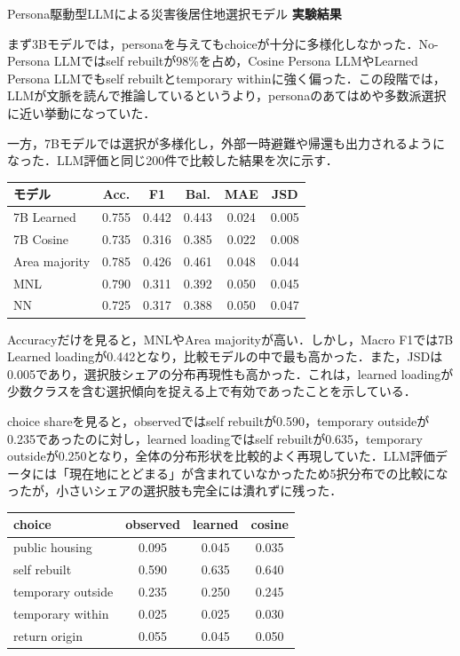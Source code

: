 \begin{column}{Persona駆動型LLMによる災害後居住地選択モデル}
\medskip
\noindent
\textbf{実験結果}

まず3Bモデルでは，personaを与えてもchoiceが十分に多様化しなかった．No-Persona LLMではself rebuiltが98\%を占め，Cosine Persona LLMやLearned Persona LLMでもself rebuiltとtemporary withinに強く偏った．この段階では，LLMが文脈を読んで推論しているというより，personaのあてはめや多数派選択に近い挙動になっていた．

一方，7Bモデルでは選択が多様化し，外部一時避難や帰還も出力されるようになった．LLM評価と同じ200件で比較した結果を次に示す．

\begin{center}
\scriptsize
\begin{tabular}{lccccc}
\toprule
モデル & Acc. & F1 & Bal. & MAE & JSD \\
\midrule
7B Learned & 0.755 & 0.442 & 0.443 & 0.024 & 0.005 \\
7B Cosine & 0.735 & 0.316 & 0.385 & 0.022 & 0.008 \\
Area majority & 0.785 & 0.426 & 0.461 & 0.048 & 0.044 \\
MNL & 0.790 & 0.311 & 0.392 & 0.050 & 0.045 \\
NN & 0.725 & 0.317 & 0.388 & 0.050 & 0.047 \\
\bottomrule
\end{tabular}
\end{center}

Accuracyだけを見ると，MNLやArea majorityが高い．しかし，Macro F1では7B Learned loadingが0.442となり，比較モデルの中で最も高かった．また，JSDは0.005であり，選択肢シェアの分布再現性も高かった．これは，learned loadingが少数クラスを含む選択傾向を捉える上で有効であったことを示している．

choice shareを見ると，observedではself rebuiltが0.590，temporary outsideが0.235であったのに対し，learned loadingではself rebuiltが0.635，temporary outsideが0.250となり，全体の分布形状を比較的よく再現していた．LLM評価データには「現在地にとどまる」が含まれていなかったため5択分布での比較になったが，小さいシェアの選択肢も完全には潰れずに残った．

\begin{center}
\scriptsize
\begin{tabular}{lccc}
\toprule
choice & observed & learned & cosine \\
\midrule
public housing & 0.095 & 0.045 & 0.035 \\
self rebuilt & 0.590 & 0.635 & 0.640 \\
temporary outside & 0.235 & 0.250 & 0.245 \\
temporary within & 0.025 & 0.025 & 0.030 \\
return origin & 0.055 & 0.045 & 0.050 \\
\bottomrule
\end{tabular}
\end{center}


\end{column}
